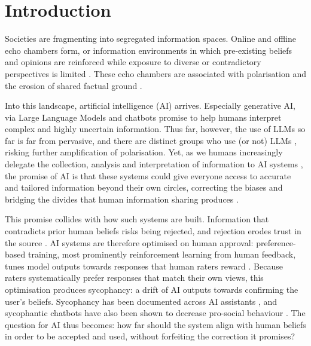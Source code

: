 \documentclass[pdflatex,sn-basic]{sn-jnl}
\begin{document}

\maketitle

\section{Introduction}\label{sec:intro}
Societies are fragmenting into segregated information spaces. Online and offline echo chambers form, or information environments in which pre-existing beliefs and opinions are reinforced while exposure to diverse or contradictory perspectives is limited \citep{mahmoudi2024echo}. These echo chambers are associated with polarisation and the erosion of shared factual ground \citep{jeon2024, cinelli2021echo, bail2018exposure, baumann2020modeling}. 

Into this landscape, artificial intelligence (AI) arrives. Especially generative AI, via Large Language Models and chatbots promise to help humans interpret complex and highly uncertain information. Thus far, however, the use of LLMs so far is far from pervasive, and there are distinct groups who use (or not) LLMs \cite{angrisani2026gaps}, risking further amplification of polarisation. Yet, as we humans increasingly delegate the collection, analysis and interpretation of information to AI systems \citep{klingbeil2024}, the promise of AI is that these systems could give everyone access to accurate and tailored information beyond their own circles, correcting the biases and bridging the divides that human information
sharing produces \citep{jeon2024}. 

This promise collides with how such systems are built. Information that contradicts prior human beliefs risks being rejected, and rejection erodes trust in the source \citep{glikson2020}.
AI systems are therefore optimised on human
approval: preference-based training, most prominently reinforcement learning from human feedback, tunes model outputs towards responses that human raters reward \citep{christiano2017, ouyang2022}. Because raters systematically prefer responses that match their own views, this optimisation produces sycophancy: a drift of AI outputs towards confirming the user's beliefs. Sycophancy has been documented across AI assistants \citep{sharma2024a, sharma2024b}, and sycophantic chatbots have also been shown to decrease pro-social behaviour \cite{cheng2026sycophantic}. The question for AI thus becomes: how far should the system align with human beliefs in order to be accepted and used, without forfeiting the correction it promises?
 
\end{document}

